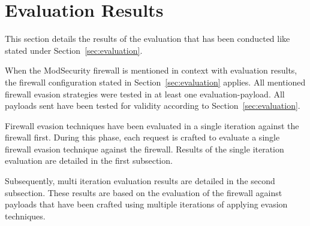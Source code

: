 \section{Evaluation Results}
\label{sec:EvaluationResults}
This section details the results of the evaluation that has been conducted like stated under Section~\ref{sec:evaluation}. 

When the ModSecurity firewall is mentioned in context with evaluation results, the firewall configuration stated in Section~\ref{sec:evaluation} applies. 
All mentioned firewall evasion strategies were tested in at least one evaluation-payload.
All payloads sent have been tested for validity according to Section~\ref{sec:evaluation}.

Firewall evasion techniques have been evaluated in a single iteration against the firewall first. During this phase, each request is crafted to evaluate a single firewall evasion technique against the firewall. Results of the single iteration evaluation are detailed in the first subsection. 

Subsequently, multi iteration evaluation results are detailed in the second subsection. These results are based on the evaluation of the firewall against payloads that have been crafted using multiple iterations of applying evasion techniques.

%
